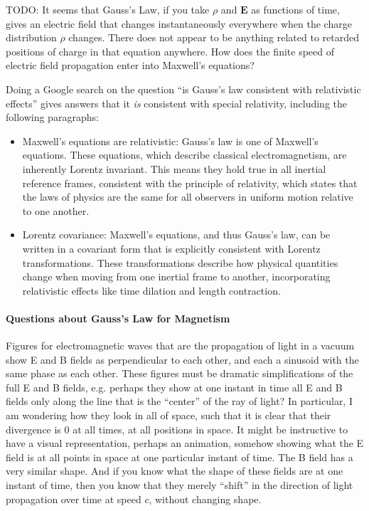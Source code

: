 \documentclass[a4paper]{article}
\theoremstyle{plain}
\theoremstyle{definition}
\newcommand{\vect}[1]{\textbf{#1}}
\begin{document}
TODO: It seems that Gauss's Law, if you take $\rho$ and $\vect{E}$ as
functions of time, gives an electric field that changes
instantaneously everywhere when the charge distribution $\rho$
changes.  There does not appear to be anything related to retarded
positions of charge in that equation anywhere.  How does the finite
speed of electric field propagation enter into Maxwell's equations?

Doing a Google search on the question ``is Gauss's law consistent with
relativistic effects'' gives answers that it {\em is} consistent with
special relativity, including the following paragraphs:

\begin{itemize}
\item
Maxwell's equations are relativistic: Gauss's law is one of Maxwell's
equations.  These equations, which describe classical
electromagnetism, are inherently Lorentz invariant.  This means they
hold true in all inertial reference frames, consistent with the
principle of relativity, which states that the laws of physics are the
same for all observers in uniform motion relative to one another.
\item
Lorentz covariance: Maxwell's equations, and thus Gauss's law, can be
written in a covariant form that is explicitly consistent with Lorentz
transformations.  These transformations describe how physical
quantities change when moving from one inertial frame to another,
incorporating relativistic effects like time dilation and length
contraction.
\end{itemize}


\paragraph{Questions about Gauss's Law for Magnetism}

Figures for electromagnetic waves that are the propagation of light in
a vacuum show E and B fields as perpendicular to each other, and each
a sinusoid with the same phase as each other.  These figures must be
dramatic simplifications of the full E and B fields, e.g. perhaps they
show at one instant in time all E and B fields only along the line
that is the ``center'' of the ray of light?  In particular, I am
wondering how they look in all of space, such that it is clear that
their divergence is 0 at all times, at all positions in space.  It
might be instructive to have a visual representation, perhaps an
animation, somehow showing what the E field is at all points in space
at one particular instant of time.  The B field has a very similar
shape.  And if you know what the shape of these fields are at one
instant of time, then you know that they merely ``shift'' in the
direction of light propagation over time at speed $c$, without
changing shape.
\end{document}
